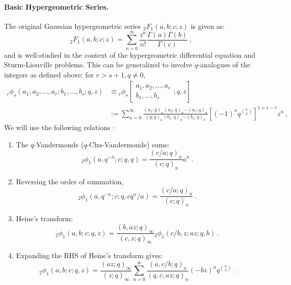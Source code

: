 \documentclass[a4paper,10pt]{article}
\newcommand{\tsf}[1]{\textsf{#1}}
\begin{document}
\begin{appendix}
\paragraph{Basic Hypergeometric Series.}
The original Gaussian hypergeometric series $_2F_1(a,b;c;z)$ is given as:
\begin{equation}
    _2F_1(a,b;c;z)=\sum_{n=0}^{\infty}\frac{z^n}{n!}\frac{\Gamma(a)\Gamma(b)}{\Gamma(c)}~,
\end{equation}
and is well-studied in the context of the hypergeometric differential equation and Sturm-Liouville problems. 
This can be generalized to involve $q$-analogues of the integers as defined above: for $r>s+1,q\neq 0$,
\begin{equation}\label{eq:phirs_def}
\begin{aligned}  { }_r \phi_s\left(a_1, a_2, \ldots, a_r ; b_1, \ldots, b_s ; q, z\right) &\equiv{ }_r \phi_s\left[\begin{array}{c}a_1, a_2, \ldots, a_r \\ b_1, \ldots, b_s\end{array} ; q, z\right] \\ & :=\sum_{n=0}^{\infty} \frac{\left(a_1 ; q\right)_n\left(a_2 ; q\right)_n \cdots\left(a_r ; q\right)_n}{(q ; q)_n\left(b_1 ; q\right)_n \cdots\left(b_s ; q\right)_n}\left[(-1)^n q^{\binom{n}{2}}\right]^{1+s-r} z^n ~, 
\end{aligned}
\end{equation}
We will use the following relations \cite{gasper2004basic}:
\begin{enumerate}
\item The $q$-Vandermonde ($q$-Chu-Vandermonde) sums:
\begin{equation}
{ }_2 \phi_1\left(a, q^{-n} ; c ; q, q\right)=\frac{(c / a ; q)_n}{(c ; q)_n} a^n~.
\end{equation}
\item Reversing the order of summation,
\begin{equation}
{ }_2 \phi_1\left(a, q^{-n} ; c ; q, c q^n / a\right)=\frac{(c / a ; q)_n}{(c ; q)_n}~ .
\end{equation}
\item Heine's transform:
\begin{equation}
    { }_2 \phi_1(a, b ; c ; q, z)=\frac{(b, a z ; q)_{\infty}}{(c, z ; q)_{\infty}}{ }_2 \phi_1(c / b, z ; a z ; q, b)~.
\end{equation}
\item Expanding the \tsf{RHS} of Heine's transform gives:
\begin{equation}\label{eq:Heine_exp}
    { }_2 \phi_1(a, b ; c ; q, z)=\frac{(a z ; q)_{\infty}}{(z ; q)_{\infty}} \sum_{n=0}^{\infty} \frac{(a, c / b ; q)_n}{(q, c, a z ; q)_n}(-b z)^n q^{\binom{n}{2}}~.
\end{equation}
\end{enumerate}

\end{appendix}
\end{document}
